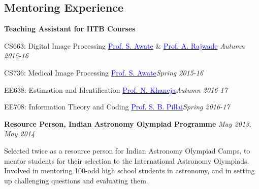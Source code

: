 \documentclass[margin,line]{res}
\newenvironment{list1}{
  \begin{list}{\ding{113}}{%
      \setlength{\itemsep}{0in}
      \setlength{\parsep}{0in} \setlength{\parskip}{0in}
      \setlength{\topsep}{0in} \setlength{\partopsep}{0in} 
      \setlength{\leftmargin}{0.17in}}}{\end{list}}
\begin{document}
\begin{resume}
\section{\sc Mentoring Experience}
\textbf{Teaching Assistant for IITB Courses}
\begin{list1}
\item[] CS663: Digital Image Processing \hspace{0.5cm} \href{https://www.cse.iitb.ac.in/~suyash}{\textcolor{blue}{Prof. S. Awate}} \& \href{https://www.cse.iitb.ac.in/~ajitvr}{\textcolor{blue}{Prof. A. Rajwade}} \hfill{\textit{Autumn 2015-16}}
\item[] CS736: Medical Image Processing \hspace{2cm} \href{https://www.cse.iitb.ac.in/~suyash}{\textcolor{blue}{Prof. S. Awate}}\hfill{\textit{Spring 2015-16}}
\item[] EE638: Estimation and Identification \hspace{1.25cm} \href{https://www.ee.iitb.ac.in/course/~ee638/Navin}{\textcolor{blue}{Prof. N. Khaneja}}\hfill{\textit{Autumn 2016-17}}
\item[] EE708: Information Theory and Coding \hspace{0.87cm} \href{https://www.ee.iitb.ac.in/wiki/faculty/bsraj}{\textcolor{blue}{Prof. S. B. Pillai}}\hfill{\textit{Spring 2016-17}}
\end{list1}

\vspace*{-0.1in}

\textbf{Resource Person, Indian Astronomy Olympiad Programme} \hfill \textit{May 2013, May 2014} \\
\vspace*{-.15in}
\begin{list1}
\item[] Selected twice as a resource person for Indian Astronomy Olympiad Camps, to mentor students for their selection to the International Astronomy Olympiads. Involved in mentoring 100-odd high school students in astronomy, and in setting up challenging questions and evaluating them.
\end{list1}


\end{resume}
\end{document}
